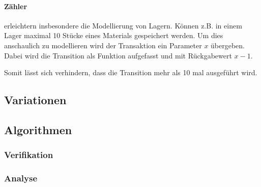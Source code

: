 \paragraph{Zähler} erleichtern insbesondere die Modellierung von Lagern.
Können z.B. in einem Lager maximal 10 Stücke eines Materials gespeichert werden.
Um dies anschaulich zu modellieren wird der Transaktion ein Parameter $x$ übergeben.
Dabei wird die Transition als Funktion aufgefasst und mit Rückgabewert $x - 1$.
\begin{center}
\end{center}
Somit lässt sich verhindern, dass die Transition mehr als 10 mal ausgeführt wird.



\subsection{Variationen}

\subsection{Algorithmen}

\subsubsection{Verifikation}

\subsubsection{Analyse}

